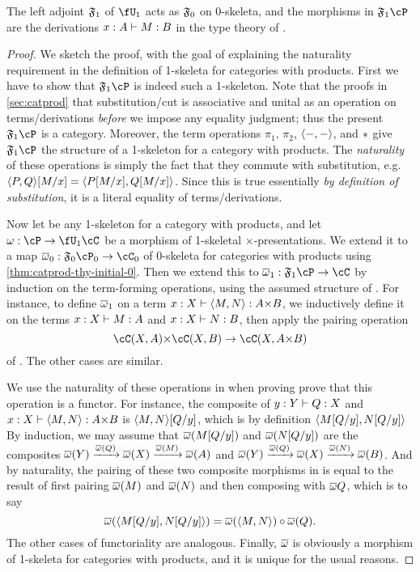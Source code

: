 \begin{thm}\label{thm:catprod-thy-initial-1}
  The left adjoint $\mathfrak{F}_{1}$ of $\fU_1$ acts as $\mathfrak{F}_{0}$ on 0-skeleta, and the morphisms in $\F1 \cP$ are the derivations $x:A\vdash M:B$ in the type theory of \cP.
\end{thm}
\begin{proof}
  We sketch the proof, with the goal of explaining the naturality requirement in the definition of 1-skeleta for categories with products.
  First we have to show that $\F1\cP$ is indeed such a 1-skeleton.
  Note that the proofs in \cref{sec:catprod} that substitution/cut is associative and unital as an operation on terms/derivations \emph{before} we impose any equality judgment; thus the present $\F1\cP$ is a category.
  Moreover, the term operations $\pi_1$, $\pi_2$, $\langle -,-\rangle$, and $\mathord{\ast}$ give $\F1\cP$ the structure of a 1-skeleton for a category with products.
  The \emph{naturality} of these operations is simply the fact that they commute with substitution, e.g.\ $\langle P,Q\rangle[M/x] = \langle P[M/x],Q[M/x]\rangle$.
  Since this is true essentially \emph{by definition of substitution}, it is a literal equality of terms/derivations.

  Now let \cC be any 1-skeleton for a category with products, and let $\pfree:\cP\to\fU_1\cC$ be a morphism of 1-skeletal $\times$-presentations.
  We extend it to a map $\free_0:\F0\cP_0 \to \cC_0$ of 0-skeleta for categories with products using \cref{thm:catprod-thy-initial-0}.
  Then we extend this to $\free_1 : \F1\cP \to \cC$ by induction on the term-forming operations, using the assumed structure of \cC.
  For instance, to define $\overline{\omega}_1$ on a term $x:X \types \pair M N : A\times B$, we inductively define it on the terms $x:X\vdash M:A$ and $x:X \vdash N:B$, then apply the pairing operation
  \[ \cC(X,A)\times \cC(X,B) \to \cC(X,A\times B) \]
  of \cC.
  The other cases are similar.

  We use the naturality of these operations in \cC when proving prove that this operation is a functor.
  For instance, the composite of $y:Y\vdash Q:X$ and $x:X \types \pair M N : A\times B$ is $\langle M,N\rangle [Q/y]$, which is by definition $\langle M[Q/y],N[Q/y]\rangle$
  By induction, we may assume that $\overline{\omega}(M[Q/y])$ and $\overline{\omega}(N[Q/y])$ are the composites $\overline{\omega}(Y)\xrightarrow{\overline{\omega}(Q)} \overline{\omega}(X) \xrightarrow{\overline{\omega}(M)} \overline{\omega}(A)$ and $\overline{\omega}(Y)\xrightarrow{\overline{\omega}(Q)} \overline{\omega}(X) \xrightarrow{\overline{\omega}(N)} \overline{\omega}(B)$.
  And by naturality, the pairing of these two composite morphisms in \cC is equal to the result of first pairing $\overline{\omega}(M)$ and $\overline{\omega}(N)$ and then composing with $\overline{\omega}{Q}$, which is to say
  \[ \overline{\omega}(\langle M[Q/y],N[Q/y]\rangle) = \overline{\omega}(\langle M,N\rangle) \circ \overline{\omega}(Q). \]
  The other cases of functoriality are analogous.
  Finally, $\overline{\omega}$ is obviously a morphism of 1-skeleta for categories with products, and it is unique for the usual reasons.
\end{proof}

